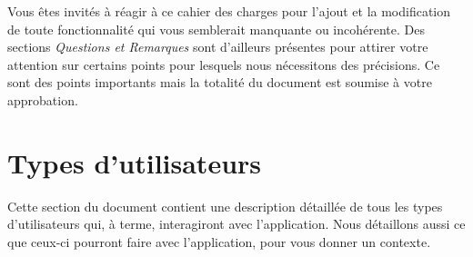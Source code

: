 \documentclass[a4paper, 11pt]{article}
\begin{document}
Vous êtes invités à réagir à ce cahier des charges pour l'ajout et la modification de toute fonctionnalité qui vous semblerait manquante ou incohérente. Des sections \emph{Questions et Remarques} sont d'ailleurs présentes pour attirer votre attention sur certains points pour lesquels nous nécessitons des précisions. Ce sont des points importants mais la totalité du document est soumise à votre approbation.

\section{Types d'utilisateurs}
\label{users}
Cette section du document contient une description détaillée de tous les types d'utilisateurs qui, à terme, interagiront avec l'application. Nous détaillons aussi ce que ceux-ci pourront faire avec l'application, pour vous donner un contexte.
\end{document}
